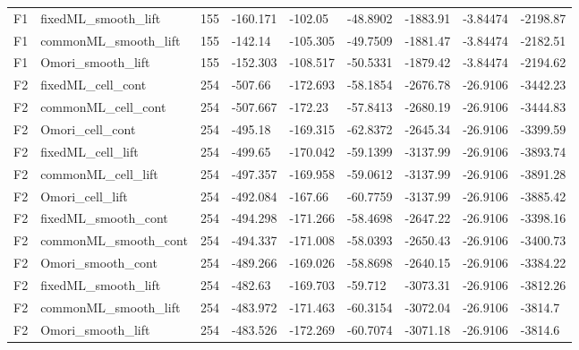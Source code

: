\begin{longtable}
{}F1 & fixedML\_\allowbreak{}smooth\_\allowbreak{}lift & 155 & -160.171 & -102.05 & -48.8902 & -1883.91 & -3.84474 & -2198.87 \\
{}F1 & commonML\_\allowbreak{}smooth\_\allowbreak{}lift & 155 & -142.14 & -105.305 & -49.7509 & -1881.47 & -3.84474 & -2182.51 \\
{}F1 & Omori\_\allowbreak{}smooth\_\allowbreak{}lift & 155 & -152.303 & -108.517 & -50.5331 & -1879.42 & -3.84474 & -2194.62 \\
{}F2 & fixedML\_\allowbreak{}cell\_\allowbreak{}cont & 254 & -507.66 & -172.693 & -58.1854 & -2676.78 & -26.9106 & -3442.23 \\
{}F2 & commonML\_\allowbreak{}cell\_\allowbreak{}cont & 254 & -507.667 & -172.23 & -57.8413 & -2680.19 & -26.9106 & -3444.83 \\
{}F2 & Omori\_\allowbreak{}cell\_\allowbreak{}cont & 254 & -495.18 & -169.315 & -62.8372 & -2645.34 & -26.9106 & -3399.59 \\
{}F2 & fixedML\_\allowbreak{}cell\_\allowbreak{}lift & 254 & -499.65 & -170.042 & -59.1399 & -3137.99 & -26.9106 & -3893.74 \\
{}F2 & commonML\_\allowbreak{}cell\_\allowbreak{}lift & 254 & -497.357 & -169.958 & -59.0612 & -3137.99 & -26.9106 & -3891.28 \\
{}F2 & Omori\_\allowbreak{}cell\_\allowbreak{}lift & 254 & -492.084 & -167.66 & -60.7759 & -3137.99 & -26.9106 & -3885.42 \\
{}F2 & fixedML\_\allowbreak{}smooth\_\allowbreak{}cont & 254 & -494.298 & -171.266 & -58.4698 & -2647.22 & -26.9106 & -3398.16 \\
{}F2 & commonML\_\allowbreak{}smooth\_\allowbreak{}cont & 254 & -494.337 & -171.008 & -58.0393 & -2650.43 & -26.9106 & -3400.73 \\
{}F2 & Omori\_\allowbreak{}smooth\_\allowbreak{}cont & 254 & -489.266 & -169.026 & -58.8698 & -2640.15 & -26.9106 & -3384.22 \\
{}F2 & fixedML\_\allowbreak{}smooth\_\allowbreak{}lift & 254 & -482.63 & -169.703 & -59.712 & -3073.31 & -26.9106 & -3812.26 \\
{}F2 & commonML\_\allowbreak{}smooth\_\allowbreak{}lift & 254 & -483.972 & -171.463 & -60.3154 & -3072.04 & -26.9106 & -3814.7 \\
{}F2 & Omori\_\allowbreak{}smooth\_\allowbreak{}lift & 254 & -483.526 & -172.269 & -60.7074 & -3071.18 & -26.9106 & -3814.6 \\
\end{longtable}\endgroup
